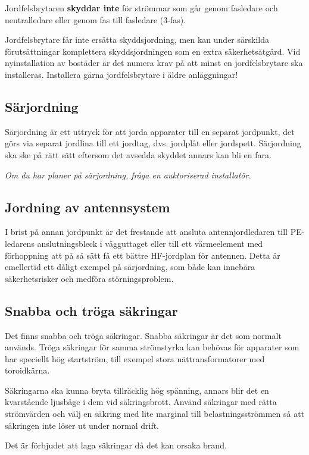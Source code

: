 Jordfelsbrytaren \textbf{skyddar inte} för strömmar som går genom fasledare
och neutralledare eller genom fas till fasledare (3-fas).

Jordfelsbrytare får inte ersätta skyddsjordning, men kan under särskilda
förutsättningar komplettera skyddsjordningen som en extra säkerhetsåtgärd.
Vid nyinstallation av bostäder är det numera krav på att minst en
jordfelsbrytare ska installeras.
Installera gärna jordfelsbrytare i äldre anläggningar!

\subsection{Särjordning}

Särjordning är ett uttryck för att jorda apparater till en separat jordpunkt,
det görs via separat jordlina till ett jordtag, dvs. jordplåt eller jordspett.
Särjordning ska ske på rätt sätt eftersom det avsedda skyddet annars kan bli en
fara.

\emph{Om du har planer på särjordning, fråga en auktoriserad installatör.}

\subsection{Jordning av antennsystem}

I brist på annan jordpunkt är det frestande att ansluta antennjordledaren till
PE-ledarens anslutningsbleck i vägguttaget eller till ett värmeelement med
förhoppning att på så sätt få ett bättre HF-jordplan för antennen.
Detta är emellertid ett dåligt exempel på särjordning, som både kan innebära
säkerhetsrisker och medföra störningsproblem.

\subsection{Snabba och tröga säkringar}

Det finns snabba och tröga säkringar.
Snabba säkringar är det som normalt används.
Tröga säkringar för samma strömstyrka kan behövas för apparater som har
speciellt hög startström, till exempel stora nättransformatorer med toroidkärna.

Säkringarna ska kunna bryta tillräcklig hög spänning, annars blir det
en kvarstående ljusbåge i dem vid säkringsbrott.
Använd säkringar med rätta strömvärden och välj en säkring med lite marginal
till belastningsströmmen så att säkringen inte löser ut under normal drift.

Det är förbjudet att laga säkringar då det kan orsaka brand.

